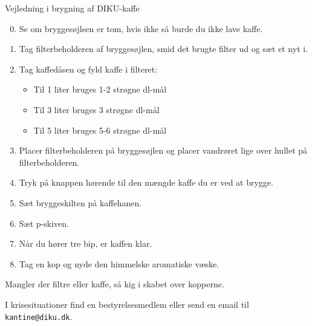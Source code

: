 \documentclass{article}
\begin{document}

\maketitle

\null
\vspace{-0.2cm}

\fontsize{18}{20}\selectfont

\vspace{-1.7cm}
\hspace{-0.9cm}\noindent Vejledning i brygning af DIKU-kaffe

\vspace{1.5cm}

\begin{enumerate}

\setcounter{enumi}{-1}

\itemsep0em

\item Se om bryggesøjlsen er tom, hvis ikke så burde du ikke lave kaffe.

\item Tag filterbeholderen af bryggesøjlen, smid det brugte filter ud og sæt et
nyt i.

\item Tag kaffedåsen og fyld kaffe i filteret:

\begin{itemize}

\bfseries

\item Til 1 liter bruges 1-2 strøgne dl-mål

\item Til 3 liter bruges 3 strøgne dl-mål

\item Til 5 liter bruges 5-6 strøgne dl-mål


\end{itemize} \normalfont

\item Placer filterbeholderen på bryggesøjlen og placer vandrøret lige over
hullet på filterbeholderen.

\item Tryk på knappen hørende til den mængde kaffe du er ved at brygge.

\item Sæt bryggeskilten på kaffehanen.

\item Sæt p-skiven.

\item Når du hører tre bip, er kaffen klar.

\item Tag en kop og nyde den himmelske aromatiske væske.

\end{enumerate}

\vspace{0.2cm}

\LARGE

\begin{center}

Mangler der filtre eller kaffe, så kig i skabet over kopperne.

I krisesituationer find en bestyrelsesmedlem eller send en email til
\texttt{kantine@diku.dk}.

\end{center}

\underskriv
\end{document}
